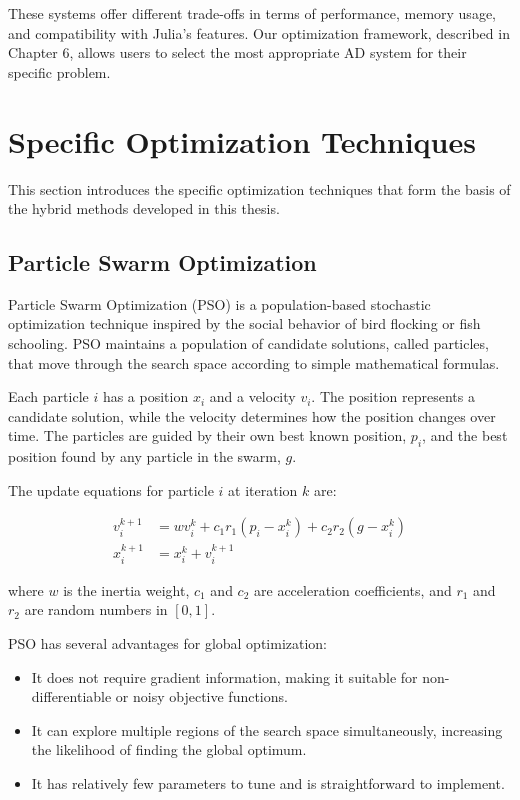 These systems offer different trade-offs in terms of performance, memory usage, and compatibility with Julia's features. Our optimization framework, described in Chapter 6, allows users to select the most appropriate AD system for their specific problem.

\section{Specific Optimization Techniques}

This section introduces the specific optimization techniques that form the basis of the hybrid methods developed in this thesis.

\subsection{Particle Swarm Optimization}

Particle Swarm Optimization (PSO) is a population-based stochastic optimization technique inspired by the social behavior of bird flocking or fish schooling. PSO maintains a population of candidate solutions, called particles, that move through the search space according to simple mathematical formulas.

Each particle $i$ has a position $x_i$ and a velocity $v_i$. The position represents a candidate solution, while the velocity determines how the position changes over time. The particles are guided by their own best known position, $p_i$, and the best position found by any particle in the swarm, $g$.

The update equations for particle $i$ at iteration $k$ are:

\begin{align}
v_i^{k+1} &= w v_i^k + c_1 r_1 (p_i - x_i^k) + c_2 r_2 (g - x_i^k) \\
x_i^{k+1} &= x_i^k + v_i^{k+1}
\end{align}

where $w$ is the inertia weight, $c_1$ and $c_2$ are acceleration coefficients, and $r_1$ and $r_2$ are random numbers in $[0, 1]$.

PSO has several advantages for global optimization:

\begin{itemize}
\item It does not require gradient information, making it suitable for non-differentiable or noisy objective functions.
\item It can explore multiple regions of the search space simultaneously, increasing the likelihood of finding the global optimum.
\item It has relatively few parameters to tune and is straightforward to implement.
\end{itemize}

